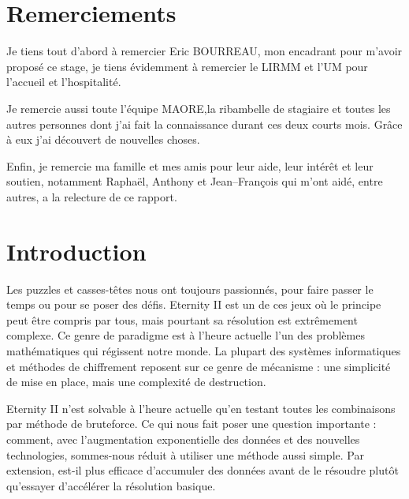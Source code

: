 \documentclass{article}
\begin{document}
	\renewcommand{\labelitemi}{$\bullet$}
	\renewcommand{\labelitemii}{$\--$}
	\renewcommand{\labelitemiii}{$\diamond$}
	\renewcommand{\labelitemiv}{$\ast$}

	\newcommand{\HRule}{\rule{\linewidth}{0.5mm}}


	
	\newpage

	\thispagestyle{empty}
	\null
	\newpage
	
	\setcounter{page}{1}
	\tableofcontents
	\newpage
	
	\listoffigures
	\newpage
	
	\listoftables
	\newpage
	\thispagestyle{empty}
	\section*{Remerciements}
	Je tiens tout d'abord à remercier Eric BOURREAU, mon encadrant pour m'avoir proposé ce stage, je tiens évidemment à remercier le LIRMM et l'UM pour l'accueil et l'hospitalité. 
	
	Je remercie aussi toute l'équipe MAORE,la ribambelle de stagiaire et toutes les autres personnes dont j'ai fait la connaissance durant ces deux courts mois. Grâce à eux j'ai découvert de nouvelles choses.
	
	Enfin, je remercie ma famille et mes amis pour leur aide, leur intérêt et leur soutien, notamment Raphaël, Anthony et Jean--François qui m'ont aidé, entre autres, a la relecture de ce rapport.
	\newpage

	\section{Introduction}

	Les puzzles et casses-têtes nous ont toujours passionnés, pour faire passer le temps ou pour se poser des défis. Eternity II est un de ces jeux où le principe peut être compris par tous, mais pourtant sa résolution est extrêmement complexe. Ce genre de paradigme est à l'heure actuelle l'un des problèmes mathématiques qui régissent notre monde. La plupart des systèmes informatiques et méthodes de chiffrement reposent sur ce genre de mécanisme : une simplicité de mise en place, mais une complexité de destruction.

	Eternity II n'est solvable à l'heure actuelle qu'en testant toutes les combinaisons par méthode de bruteforce. Ce qui nous fait poser une question importante : comment, avec l'augmentation exponentielle des données et des nouvelles technologies, sommes-nous réduit à utiliser une méthode aussi simple. Par extension, est-il plus efficace d'accumuler des données avant de le résoudre plutôt qu'essayer d'accélérer la résolution basique.
\end{document}
